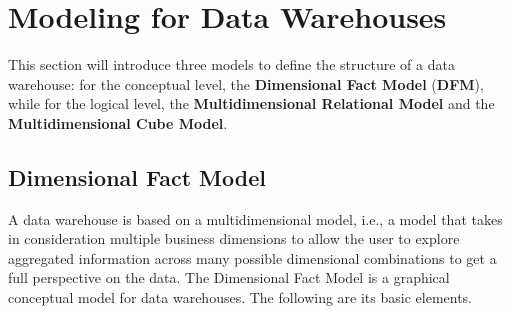 \section{Modeling for Data Warehouses}

This section will introduce three models to define the structure of a data warehouse: for the conceptual level, the \textbf{Dimensional Fact Model} (\textbf{DFM}), while for the logical level, the \textbf{Multidimensional Relational Model} and the \textbf{Multidimensional Cube Model}.

\subsection{Dimensional Fact Model}

A data warehouse is based on a multidimensional model, i.e., a model that takes in consideration multiple business dimensions to allow the user to explore aggregated information across many possible dimensional combinations to get a full perspective on the data. The Dimensional Fact Model is a graphical conceptual model for data warehouses. The following are its basic elements.

